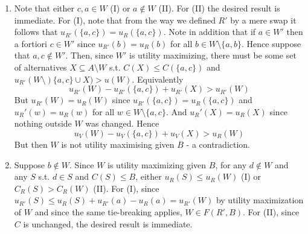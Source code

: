 \documentclass{article}
\begin{document}
\begin{enumerate}
\item Note that either $c,a \in W$ (I) or $a\notin W$ (II). For (II) the desired result is immediate. For (I), note that from the way we defined $R'$ by a mere swap it follows that $u_{R'}(\{a,c\})=u_R(\{a,c\})$. Note in addition that if $a\in W'$ then a fortiori $c\in W'$ since $u_{R'}(b)=u_R(b)$ for all $b\in W\setminus \{a,b\}$. Hence suppose that $a,c\notin W'$. Then, since $W'$ is utility maximizing, there must be some set of alternatives $X\subseteq A\setminus W$ s.t. $C(X)\leq C(\{a,c\})$ and $u_{R'}(W\setminus)\{a,c\}\cup X)>u(W)$. Equivalently \[u_{R'}(W)-u_{R'}(\{a,c\})+u_{R'}(X)>u_{R'}(W)\] But $u_{R'}(W)=u_{R}(W)$ since $u_{R'}(\{a,c\})=u_R(\{a,c\})$ and $u_R'(w)=u_R(w)$ for all $w\in W\setminus \{a,c\}$. And $u_R'(X)=u_R(X)$ since nothing outside $W$ was changed. Hence \[u_V(W)-u_V(\{a,c\})+u_V(X)>u_R(W)\] But then $W$ is not utility maximising given $B$ - a contradiction.

\item Suppose $b\notin W$. Since $W$ is utility maximizing given $B$, for any $d\notin W$ and any $S$ s.t. $d\in S$ and $C(S)\leq  B$, either $u_R(S)\leq u_R(W)$ (I) or $C_R(S)>C_R(W)$ (II). For (I), since $u_{R'}(S) \leq  u_{R}(S)+ u_{R'}(a)- u_{R}(a)= u_{R'}(W)$ by utility maximization of $W$ and since the same tie-breaking applies, $W\in F(R',B)$. For (II), since $C$ is unchanged, the desired result is immediate.

\end{enumerate}
\end{document}
